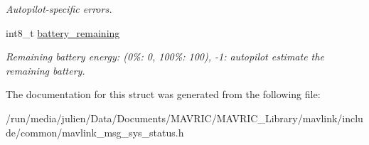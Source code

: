 \begin{DoxyCompactItemize}
\begin{DoxyCompactList}\small\item\em Autopilot-\/specific errors. \end{DoxyCompactList}\item 
\hypertarget{struct____mavlink__sys__status__t_a89ff7e5cb3d8a698ace5c6653479b71e}{int8\+\_\+t \hyperlink{struct____mavlink__sys__status__t_a89ff7e5cb3d8a698ace5c6653479b71e}{battery\+\_\+remaining}}\label{struct____mavlink__sys__status__t_a89ff7e5cb3d8a698ace5c6653479b71e}

\begin{DoxyCompactList}\small\item\em Remaining battery energy\+: (0\%\+: 0, 100\%\+: 100), -\/1\+: autopilot estimate the remaining battery. \end{DoxyCompactList}\end{DoxyCompactItemize}


The documentation for this struct was generated from the following file\+:\begin{DoxyCompactItemize}
\item 
/run/media/julien/\+Data/\+Documents/\+M\+A\+V\+R\+I\+C/\+M\+A\+V\+R\+I\+C\+\_\+\+Library/mavlink/include/common/mavlink\+\_\+msg\+\_\+sys\+\_\+status.\+h\end{DoxyCompactItemize}
